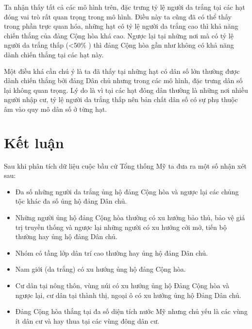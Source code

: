 \documentclass[14pt, a4paper]{article}
\numberwithin{equation}{section}
\numberwithin{figure}{section}
\numberwithin{dl}{section}
\numberwithin{md}{section}
\numberwithin{bd}{section}
\numberwithin{dn}{section}
\numberwithin{hq}{section}
\begin{document}
    Ta nhận thấy tất cả các mô hình trên, đặc trưng tỷ lệ người da trắng tại các hạt đóng vai trò rất quan trọng trong mô hình.
    Điều này ta cũng đã có thể thấy trong phần trực quan hóa, những hạt có tỷ lệ người da trắng cao thì khả năng chiến thắng của đảng Cộng hòa khá cao.
    Ngược lại tại những nơi mà có tỷ lệ người da trắng thấp (<50\% ) thì đảng Cộng hòa gần như không có khả năng dành chiến thắng tại các hạt này.

    Một điều khá cần chú ý là ta đã thấy tại những hạt có dân số lớn thường được dành chiến thắng bởi đảng Dân chủ nhưng trong các mô hình, đặc trưng dân số lại không quan trọng.
    Lý do là vì tại các hạt đông dân thường là những nơi nhiều người nhập cư, tỷ lệ người da trắng thấp nên bản chất dân số có sự phụ thuộc âm vào quy mô dân số ở từng hạt.

    \section{Kết luận}

    Sau khi phân tích dữ liệu cuộc bầu cử Tổng thống Mỹ ta đưa ra một số nhận xét sau:

    \begin{itemize}
        \item Đa số những người da trắng ủng hộ đảng Cộng hòa và ngược lại các chủng tộc khác đa số ủng hộ đảng Dân chủ.
        \item Những người ủng hộ đảng Cộng hòa thường có xu hướng bảo thủ, bảo vệ giá trị truyền thống và ngược lại những người có xu hướng cởi mở, tiến bộ thường hay ủng hộ đảng Dân chủ.
        \item Nhóm có tầng lớp dân trí cao thường hay ủng hộ đảng Dân chủ.
        \item Nam giới (da trắng) có xu hướng ủng hộ đảng Cộng hòa.
        \item Cư dân tại nông thôn, vùng núi có xu hướng ủng hộ Đảng Cộng hòa và ngược lại, cư dân tại thành thị, ngoại ô có xu hướng ủng hộ Đảng Dân chủ.
        \item Đảng Cộng hòa thắng tại đa số diện tích nước Mỹ nhưng chủ yếu là các vùng ít dân cư và hay thua tại các vùng đông dân cư.
    \end{itemize}

    \newpage
    \printbibliography[title={TÀI LIỆU THAM KHẢO}]
\end{document}
